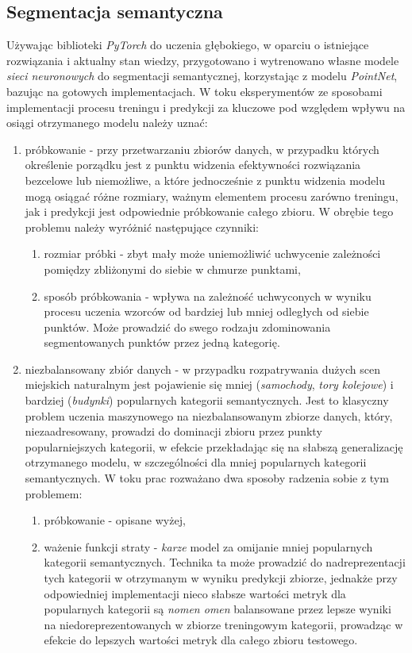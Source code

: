 \subsection{Segmentacja semantyczna}
Używając biblioteki \textit{PyTorch} do uczenia głębokiego, w oparciu o istniejące rozwiązania i aktualny stan wiedzy, przygotowano i wytrenowano własne modele \emph{sieci neuronowych} do segmentacji semantycznej, korzystając z modelu \textit{PointNet}\cite{pointnet}, bazując na gotowych implementacjach\cite{Pytorch_Pointnet_Pointnet2}.
W toku eksperymentów ze sposobami implementacji procesu treningu i predykcji za kluczowe pod względem wpływu na osiągi otrzymanego modelu należy uznać:
\begin{enumerate}
    \item próbkowanie - przy przetwarzaniu zbiorów danych, w przypadku których określenie porządku jest z punktu widzenia efektywności rozwiązania bezcelowe lub niemożliwe, a które jednocześnie z punktu widzenia modelu mogą osiągać różne rozmiary, ważnym elementem procesu zarówno treningu, jak i predykcji jest odpowiednie próbkowanie całego zbioru. W obrębie tego problemu należy wyróżnić następujące czynniki:
    \begin{enumerate}
        \item rozmiar próbki - zbyt mały może uniemożliwić uchwycenie zależności pomiędzy zbliżonymi do siebie w chmurze punktami,
        \item sposób próbkowania - wpływa na zależność uchwyconych w wyniku procesu uczenia wzorców od bardziej lub mniej odległych od siebie punktów. Może prowadzić do swego rodzaju zdominowania segmentowanych punktów przez jedną kategorię.
    \end{enumerate}
    \item niezbalansowany zbiór danych - w przypadku rozpatrywania dużych scen miejskich naturalnym jest pojawienie się mniej (\textit{samochody}, \textit{tory kolejowe}) i bardziej (\textit{budynki}) popularnych kategorii semantycznych. Jest to klasyczny problem uczenia maszynowego na niezbalansowanym zbiorze danych, który, niezaadresowany, prowadzi do dominacji zbioru przez punkty popularniejszych kategorii, w efekcie przekładając się na słabszą generalizację otrzymanego modelu, w szczególności dla mniej popularnych kategorii semantycznych. W toku prac rozważano dwa sposoby radzenia sobie z tym problemem:
    \begin{enumerate}
        \item próbkowanie - opisane wyżej,
        \item ważenie funkcji straty - \textit{karze} model za omijanie mniej popularnych kategorii semantycznych. Technika ta może prowadzić do nadreprezentacji tych kategorii w otrzymanym w wyniku predykcji zbiorze, jednakże przy odpowiedniej implementacji nieco słabsze wartości metryk dla popularnych kategorii są \textit{nomen omen} balansowane przez lepsze wyniki na niedoreprezentowanych w zbiorze treningowym kategorii, prowadząc w efekcie do lepszych wartości metryk dla całego zbioru testowego.

\end{enumerate}
\end{enumerate}
